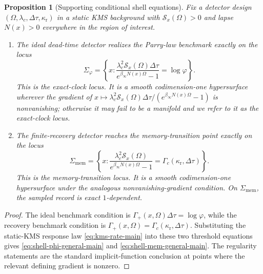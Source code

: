 \documentclass[11pt]{article}
\newtheorem{proposition}[theorem]{Proposition}
\theoremstyle{definition}
\begin{document}
\begin{proposition}[Supporting conditional shell equations]\label{thm:shells-general-main}
Fix a detector design $(\Omega,\lambda_c,\Delta\tau,\kappa_{\mathrm r})$ in a static KMS background with $\mathcal S_x(\Omega)>0$ and lapse $N(x)>0$ everywhere in the region of interest.
\begin{enumerate}[label=\textup{(\roman*)},leftmargin=2.2em,itemsep=0.25em]
\item The ideal dead-time detector realizes the Parry-law benchmark exactly on the locus
\begin{equation}\label{eq:shell-phi-general-main}
\Sigma_{\varphi}=
\left\{x:
\frac{\lambda_c^2\mathcal S_x(\Omega)\Delta\tau}{e^{\beta_\infty N(x)\Omega}-1}=\log\varphi
\right\}.
\end{equation}
This is the exact-clock locus. It is a smooth codimension-one hypersurface wherever the gradient of $x\mapsto\lambda_c^2\mathcal S_x(\Omega)\Delta\tau/(e^{\beta_\infty N(x)\Omega}-1)$ is nonvanishing; otherwise it may fail to be a manifold and we refer to it as the exact-clock locus.

\item The finite-recovery detector reaches the memory-transition point exactly on the locus
\begin{equation}\label{eq:shell-mem-general-main}
\Sigma_{\mathrm{mem}}=
\left\{x:
\frac{\lambda_c^2\mathcal S_x(\Omega)}{e^{\beta_\infty N(x)\Omega}-1}
=\Gamma_c(\kappa_{\mathrm r},\Delta\tau)
\right\}.
\end{equation}
This is the memory-transition locus. It is a smooth codimension-one hypersurface under the analogous nonvanishing-gradient condition. On $\Sigma_{\mathrm{mem}}$, the sampled record is exact $1$-dependent.
\end{enumerate}
\end{proposition}

\begin{proof}
The ideal benchmark condition is $\Gamma_+(x,\Omega)\Delta\tau=\log\varphi$, while the recovery benchmark condition is $\Gamma_+(x,\Omega)=\Gamma_c(\kappa_{\mathrm r},\Delta\tau)$. Substituting the static-KMS response law \eqref{eq:kms-rate-main} into these two threshold equations gives \eqref{eq:shell-phi-general-main} and \eqref{eq:shell-mem-general-main}. The regularity statements are the standard implicit-function conclusion at points where the relevant defining gradient is nonzero.
\end{proof}
\end{document}

